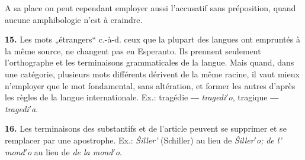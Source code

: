 A sa place on peut cependant employer aussi l’accusatif sans préposition, quand aucune amphibologie n’est à craindre.

\textbf{15.} Les mots „étrangers“ c.-à-d. ceux que la plupart des langues ont empruntés à la même source, ne changent pas en Esperanto. Ils prennent seulement l’orthographe et les terminaisons grammaticales de la langue. Mais quand, dans une catégorie, plusieurs mots différents dérivent de la même racine, il vaut mieux n’employer que le mot fondamental, sans altération, et former les autres d’après les règles de la langue internationale. Ex.: tragédie ― \emph{tragedi$'$o}, tragique ― \emph{tragedi$'$a}.

\textbf{16.} Les terminaisons des substantifs et de l’article peuvent se supprimer et se remplacer par une apostrophe. Ex.: \emph{Ŝiller’} (Schiller) au lieu de \emph{Ŝiller$'$o;} \emph{de l’ mond$'$o} au lieu de \emph{de la mond$'$o}.

\newpage
